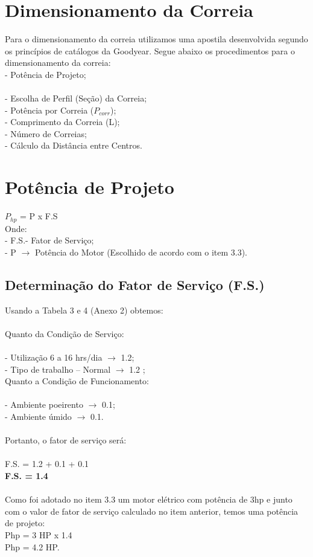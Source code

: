 \documentclass[11pt,a4paper]{report}
\begin{document}
\section{Dimensionamento da Correia}
Para o dimensionamento da correia utilizamos uma apostila desenvolvida
segundo os princípios de cat\'alogos da Goodyear.
Segue abaixo os procedimentos para o dimensionamento da correia:\\
- Pot\^encia de Projeto;\\\\
- Escolha de Perfil (Se\c{c}\~ao) da Correia;\\
- Pot\^encia por Correia ($P_{corr}$);\\
- Comprimento da Correia (L);\\
- N\'umero de Correias;\\
- C\'alculo da Dist\^ancia entre Centros.\\
\section{Pot\^encia de Projeto}
${P_{hp}}$ = P x F.S\\
Onde:\\- F.S.- Fator de Serviço;\\
- P $\rightarrow$ Pot\^encia do Motor (Escolhido de acordo com o item 3.3).\\
\subsection{Determina\c{c}\~ao do Fator de Servi\c{c}o (F.S.)}
Usando a Tabela 3 e 4 (Anexo 2) obtemos:\\\\
Quanto da Condi\c{c}\~ao de Servi\c{c}o:\\\\
- Utiliza\c{c}\~ao 6 a 16 hrs/dia $\rightarrow$ 1.2;\\
- Tipo de trabalho – Normal $\rightarrow$ 1.2 ;\\
Quanto a Condi\c{c}\~ao de Funcionamento:\\\\
- Ambiente poeirento $\rightarrow$ 0.1;\\
- Ambiente úmido $\rightarrow$ 0.1.\\\\
Portanto, o fator de servi\c{c}o ser\'a:\\\\
F.S. = 1.2 + 0.1 + 0.1\\
\textbf{F.S. = 1.4}\\\\
Como foi adotado no item 3.3 um motor el\'etrico com pot\^encia de 3hp e
junto com o valor de fator de servi\c{c}o calculado no item anterior, temos uma
pot\^encia de projeto:\\
Php = 3 HP x 1.4\\
Php = 4.2 HP.\\
\end{document}
